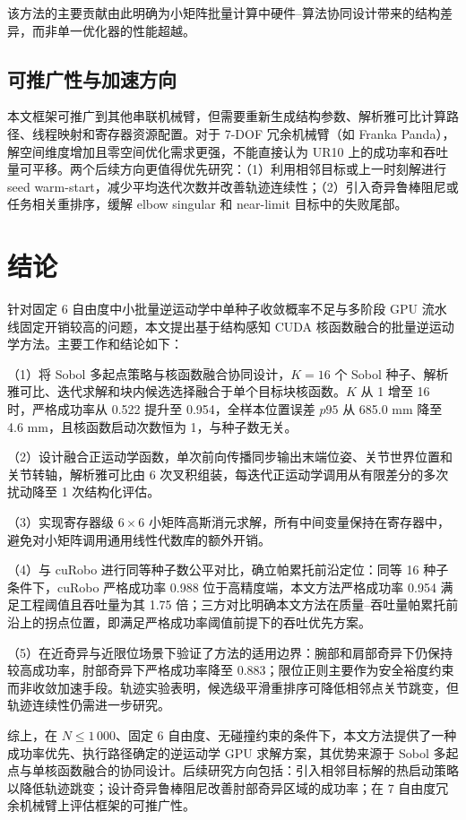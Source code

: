 \documentclass[twocolumn,a4paper,10pt]{ctexart}
\begin{document}
该方法的主要贡献由此明确为小矩阵批量计算中硬件--算法协同设计带来的结构差异，而非单一优化器的性能超越。

\subsection{可推广性与加速方向}

本文框架可推广到其他串联机械臂，但需要重新生成结构参数、解析雅可比计算路径、线程映射和寄存器资源配置。对于 7-DOF 冗余机械臂（如 Franka Panda\cite{moveit}），解空间维度增加且零空间优化需求更强，不能直接认为 UR10 上的成功率和吞吐量可平移。两个后续方向更值得优先研究：（1）利用相邻目标或上一时刻解进行 seed warm-start，减少平均迭代次数并改善轨迹连续性；（2）引入奇异鲁棒阻尼或任务相关重排序，缓解 elbow singular 和 near-limit 目标中的失败尾部。

\FloatBarrier
\section{结论}

针对固定 6 自由度中小批量逆运动学中单种子收敛概率不足与多阶段 GPU 流水线固定开销较高的问题，本文提出基于结构感知 CUDA 核函数融合的批量逆运动学方法。主要工作和结论如下：

（1）将 Sobol 多起点策略与核函数融合协同设计，$K=16$ 个 Sobol 种子、解析雅可比、迭代求解和块内候选选择融合于单个目标块核函数。$K$ 从 1 增至 16 时，严格成功率从 0.522 提升至 0.954，全样本位置误差 $p95$ 从 685.0 mm 降至 4.6 mm，且核函数启动次数恒为 1，与种子数无关。

（2）设计融合正运动学函数，单次前向传播同步输出末端位姿、关节世界位置和关节转轴，解析雅可比由 6 次叉积组装，每迭代正运动学调用从有限差分的多次扰动降至 1 次结构化评估。

（3）实现寄存器级 $6\times6$ 小矩阵高斯消元求解，所有中间变量保持在寄存器中，避免对小矩阵调用通用线性代数库的额外开销。

（4）与 cuRobo 进行同等种子数公平对比，确立帕累托前沿定位：同等 16 种子条件下，cuRobo 严格成功率 0.988 位于高精度端，本文方法严格成功率 0.954 满足工程阈值且吞吐量为其 1.75 倍；三方对比明确本文方法在质量--吞吐量帕累托前沿上的拐点位置，即满足严格成功率阈值前提下的吞吐优先方案。

（5）在近奇异与近限位场景下验证了方法的适用边界：腕部和肩部奇异下仍保持较高成功率，肘部奇异下严格成功率降至 0.883；限位正则主要作为安全裕度约束而非收敛加速手段。轨迹实验表明，候选级平滑重排序可降低相邻点关节跳变，但轨迹连续性仍需进一步研究。

综上，在 $N\le1\,000$、固定 6 自由度、无碰撞约束的条件下，本文方法提供了一种成功率优先、执行路径确定的逆运动学 GPU 求解方案，其优势来源于 Sobol 多起点与单核函数融合的协同设计。后续研究方向包括：引入相邻目标解的热启动策略以降低轨迹跳变；设计奇异鲁棒阻尼改善肘部奇异区域的成功率；在 7 自由度冗余机械臂上评估框架的可推广性。
\end{document}
